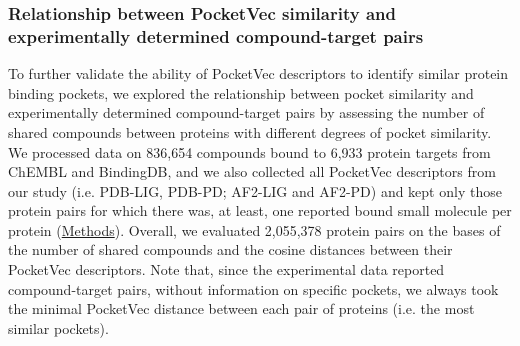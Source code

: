 
\subsubsection{Relationship between PocketVec similarity and experimentally determined compound-target pairs}
\label{PocketVec_ResultsAndDiscussion_Relationship_PocketVecSimilarity_CPD-TARGET_pairs}

To further validate the ability of PocketVec descriptors to identify similar protein binding pockets, we explored the relationship between pocket similarity and experimentally determined compound-target pairs by assessing the number of shared compounds between proteins with different degrees of pocket similarity. We processed data on 836,654 compounds bound to 6,933 protein targets from ChEMBL\cite{zdrazil_chembl_2024} and BindingDB\cite{gilson_bindingdb_2016}, and we also collected all PocketVec descriptors from our study (i.e. PDB-LIG, PDB-PD; AF2-LIG and AF2-PD) and kept only those protein pairs for which there was, at least, one reported bound small molecule per protein (\hyperref[PocketVec_Methods]{Methods}). Overall, we evaluated 2,055,378 protein pairs on the bases of the number of shared compounds and the cosine distances between their PocketVec descriptors. Note that, since the experimental data reported compound-target pairs, without information on specific pockets, we always took the minimal PocketVec distance between each pair of proteins (i.e. the most similar pockets). 

